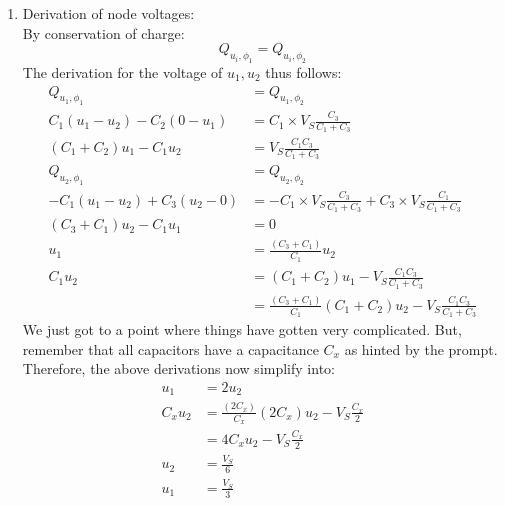 {\begin{enumerate}
{\begin{enumerate}
{                }
                \item[4.] {
                    Derivation of node voltages: \\
                    By conservation of charge:
                    \[Q_{u_i, \phi_1} = Q_{u_i, \phi_2}\]
                    The derivation for the voltage of $u_1, u_2$ thus follows:
                    \begin{align*}
                        Q_{u_1, \phi_1} &= Q_{u_1, \phi_2} \\
                        C_1 (u_1 - u_2) - C_2 (0 - u_1) &= C_1 \times V_S \frac{C_3}{C_1 + C_3} \\
                        (C_1 + C_2) u_1 - C_1 u_2 &= V_S \frac{C_1 C_3}{C_1 + C_3} \\
                        Q_{u_2, \phi_1} &= Q_{u_2, \phi_2} \\
                        -C_1 (u_1 - u_2) + C_3 (u_2 - 0) &= - C_1 \times V_S \frac{C_3}{C_1 + C_3} + C_3 \times V_S \frac{C_1}{C_1 + C_3} \\
                        (C_3 + C_1) u_2 - C_1 u_1 &= 0 \\
                        u_1 &= \frac{(C_3 + C_1)}{C_1} u_2 \\
                        C_1 u_2 &= (C_1 + C_2) u_1 - V_S \frac{C_1 C_3}{C_1 + C_3} \\
                        &= \frac{(C_3 + C_1)}{C_1}(C_1 + C_2) u_2 - V_S \frac{C_1 C_3}{C_1 + C_3}
                    \end{align*}
                    We just got to a point where things have gotten very complicated. But, remember that all capacitors have a capacitance $C_x$ as hinted by the prompt. Therefore, the above derivations now simplify into:
                    \begin{align*}
                        u_1 &= 2 u_2 \\
                        C_x u_2 &= \frac{(2C_x)}{C_x}(2C_x) u_2 - V_S \frac{C_x}{2} \\
                        &= 4 C_x u_2 - V_S \frac{C_x}{2} \\
                        u_2 &= \frac{V_S}{6} \\
                        u_1 &= \frac{V_S}{3}
                    \end{align*}
                    
}
\end{enumerate}}
\end{enumerate}}
